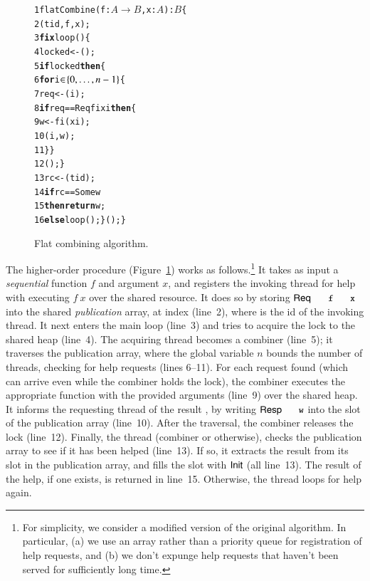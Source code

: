\begin{figure} 
\centering 
{\scriptsize
%
\begin{minipage}[l]{4.7cm}
\begin{alltt}
\num{ 1} flatCombine(f: \(A{}\to{}B\), x: \(A\)): \(B\) \{
\num{ 2}  (tid, f, x);          
\num{ 3}  \textbf{fix} loop() \{       
\num{ 4}   locked <- (); 
\num{ 5}   \textbf{if} locked \textbf{then} \{
\num{ 6}    \textbf{for} i\(\in\!\set{0, \ldots, n-1}\) \{
\num{ 7}     req <- (i);
\num{ 8}     \textbf{if} req == \textsf{Req} fi xi \textbf{then} \{         
\num{ 9}      w <- fi(xi);    
\num{10}      (i, w);
\num{11}     \}\}
\num{12}    ();\}
\num{13}  rc <- (tid);
\num{14}  \textbf{if} rc == \textsf{Some} w 
\num{15}  \textbf{then} \textbf{return} w;
\num{16}  \textbf{else} loop();\}();\}
\end{alltt} 
\end{minipage} 
%
}
\caption{Flat combining algorithm.}
\label{fig:flatco}
\end{figure}
%
The higher-order  procedure
(Figure~\ref{fig:flatco}) works as follows.\footnote{For simplicity,
  we consider a modified version of the original algorithm. In
  particular, (a) we use an array rather than a priority queue for
  registration of help requests, and (b) we don't expunge help
  requests that haven't been served for sufficiently long time.} It
takes as input a \emph{sequential} function $f$ and argument $x$, and
registers the invoking thread for help with executing $f\ x$ over the
shared resource. It does so by storing $\Req{\eesc{f}}{\eesc{x}}$ into
the shared \emph{publication} array, at index  (line~2),
where  is the id of the invoking thread.
%
It next enters the main loop (line~3) and tries to acquire the lock to
the shared heap (line~4).
%
The acquiring thread becomes a combiner (line~5); it traverses the
publication array, where the global variable $n$ bounds the number of
threads, checking for help requests (lines 6--11). For each request
found (which can arrive even while the combiner holds the lock), the
combiner executes the appropriate function with the provided arguments
(line~9) over the shared heap. It informs the requesting thread
 of the result , by writing $\Resp{\eesc{w}}$ into the
slot  of the publication array (line~10).
%
After the traversal, the combiner releases the lock (line~12).
%
Finally, the thread (combiner or otherwise), checks the publication
array to see if it has been helped (line~13). If so, it extracts the
result  from its slot in the publication array, and fills the
slot with $\mathsf{Init}$ (all line~13). The result of the help, if one
exists, is returned in line~15. Otherwise, the thread loops for help
again.

